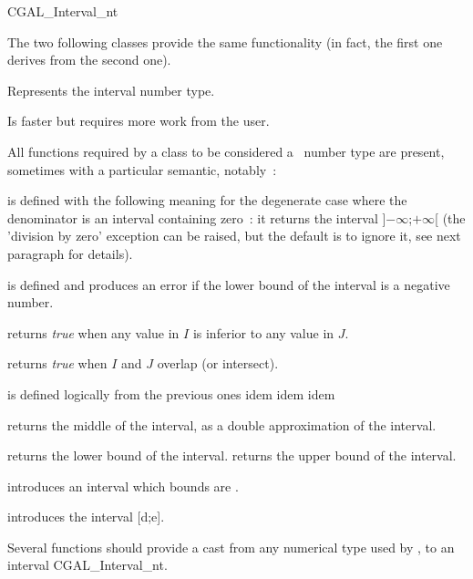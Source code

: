 \begin{ccClass} {CGAL_Interval_nt}


\ccTypes

The two following classes provide the same functionality (in fact, the
first one derives from the second one).

 {Represents the interval number type.}

 {Is faster but requires more work
from the user.}

All functions required by a class to be considered a \cgal\ number type are
present, sometimes with a particular semantic, notably~:


 {is defined with the
following meaning for the degenerate case where the denominator is an interval
containing zero~: it returns the interval ]$-\infty$;$+\infty$[ (the 'division
by zero' exception can be raised, but the default is to ignore it, see next
paragraph for details).}

 {is defined and
produces an error if the lower bound of the interval is a negative number.}

 {returns {\it true} when any
value in $I$ is inferior to any value in $J$.}

 {returns {\it true} when $I$
and $J$ overlap (or intersect).}

 {is defined logically from the
previous ones}
 {idem}
 {idem}
 {idem}

 {returns the
middle of the interval, as a double approximation of the interval.}

 {returns the lower bound of the interval.}
 {returns the upper bound of the interval.}

\smallskip

\ccCreation

 {introduces an interval
which bounds are .}

{introduces the interval [d;e].}

Several functions should provide a cast from any numerical type used by \cgal,
to an interval CGAL\_Interval\_nt.

\end{ccClass}

